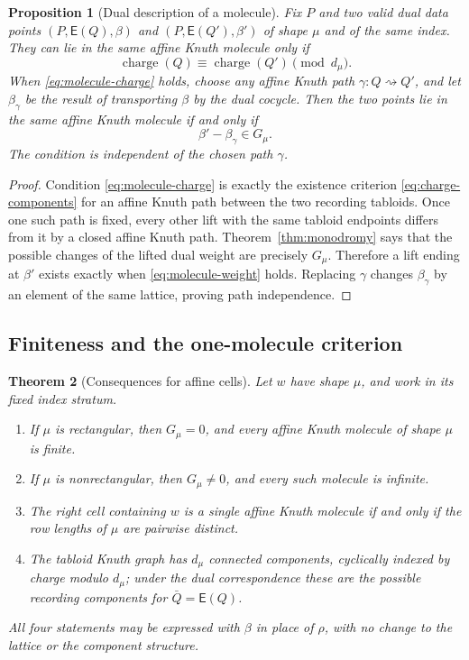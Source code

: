 \documentclass[11pt]{article}
\newtheorem{theorem}{Theorem}[section]
\newtheorem{proposition}[theorem]{Proposition}
\theoremstyle{definition}
\theoremstyle{remark}
\newcommand{\E}{\mathsf E}
\begin{document}
\begin{proposition}[Dual description of a molecule]\label{prop:dual-molecule}
Fix \(P\) and two valid dual data points
\((P,\E(Q),\beta)\) and \((P,\E(Q'),\beta')\) of shape \(\mu\) and of the same index.
They can lie in the same affine Knuth molecule only if
\begin{equation}\label{eq:molecule-charge}
 \operatorname{charge}(Q)\equiv\operatorname{charge}(Q')\pmod{d_\mu}.
\end{equation}
When \eqref{eq:molecule-charge} holds, choose any affine Knuth path
\(\gamma:Q\rightsquigarrow Q'\), and let \(\beta_\gamma\) be the result of transporting
\(\beta\) by the dual cocycle.  Then the two points lie in the same affine Knuth
molecule if and only if
\begin{equation}\label{eq:molecule-weight}
                         \beta'-\beta_\gamma\in G_\mu.
\end{equation}
The condition is independent of the chosen path \(\gamma\).
\end{proposition}

\begin{proof}
Condition \eqref{eq:molecule-charge} is exactly the existence criterion
\eqref{eq:charge-components} for an affine Knuth path between the two recording
tabloids.  Once one such path is fixed, every other lift with the same tabloid endpoints
differs from it by a closed affine Knuth path.  Theorem~\ref{thm:monodromy} says that the
possible changes of the lifted dual weight are precisely \(G_\mu\).  Therefore a lift
ending at \(\beta'\) exists exactly when \eqref{eq:molecule-weight} holds.  Replacing
\(\gamma\) changes \(\beta_\gamma\) by an element of the same lattice, proving path
independence.
\end{proof}

\subsection{Finiteness and the one-molecule criterion}

\begin{theorem}[Consequences for affine cells]\label{thm:cell-consequences}
Let \(w\) have shape \(\mu\), and work in its fixed index stratum.
\begin{enumerate}[label=(\roman*),leftmargin=2.2em]
\item If \(\mu\) is rectangular, then \(G_\mu=0\), and every affine Knuth molecule of
shape \(\mu\) is finite.
\item If \(\mu\) is nonrectangular, then \(G_\mu\ne0\), and every such molecule is
infinite.
\item The right cell containing \(w\) is a single affine Knuth molecule if and only if
the row lengths of \(\mu\) are pairwise distinct.
\item The tabloid Knuth graph has \(d_\mu\) connected components, cyclically indexed by
charge modulo \(d_\mu\); under the dual correspondence these are the possible recording
components for \(\bar Q=\E(Q)\).
\end{enumerate}
All four statements may be expressed with \(\beta\) in place of \(\rho\), with no change
to the lattice or the component structure.
\end{theorem}
\end{document}
